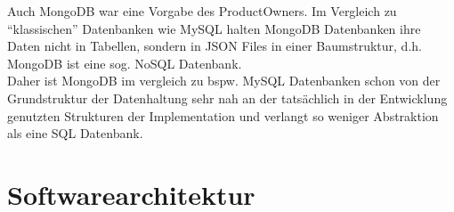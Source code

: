 \begin{table}[!h]
    \centering
    \end{table}

Auch MongoDB war eine Vorgabe des ProductOwners.
Im Vergleich zu “klassischen” Datenbanken wie MySQL halten MongoDB Datenbanken ihre Daten nicht in Tabellen, sondern in JSON Files in einer Baumstruktur, d.h. MongoDB ist eine sog. NoSQL Datenbank. \\
Daher ist MongoDB im vergleich zu bspw. MySQL Datenbanken schon von der Grundstruktur der Datenhaltung sehr nah an der tatsächlich in der Entwicklung genutzten Strukturen der Implementation und verlangt so weniger Abstraktion als eine SQL Datenbank.
\pagebreak
\section{Softwarearchitektur}


